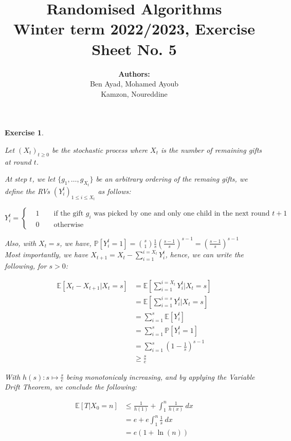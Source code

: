 \documentclass{article}
\title{Randomised Algorithms \\
Winter term 2022/2023, Exercise Sheet No. 5}
\author{
    \textbf{Authors:} \\
    Ben Ayad, Mohamed Ayoub \\
    Kamzon, Noureddine
}
\newtheorem{exo}{Exercise}
\def\P{\mathbb{P}}
\def\E{\mathbb{E}}
\begin{document}
\maketitle

\begin{exo}{\ \\}

Let $(X_t)_{t\geq0}$ be the stochastic process where $X_t$ is the number of remaining gifts at round $t$.

\noindent
At step $t$, we let $\{g_1, \dots, g_{X_t}\}$ be an arbitrary ordering of the remaing gifts, we define the RVs $(Y_i^{t})_{1\leq i\leq X_t}$ as follows: 

\[   
Y_i^{t} = 
\begin{cases}
    &1 \quad \quad \text{if the gift $g_i$ was picked by one and only one child in the next round $t+1$} \\
    &0 \quad \quad \text{otherwise}
\end{cases}
\]

Also, with $X_t = s$, we have, $\P[Y_i^t = 1] = \binom{s}{1} \frac{1}{s} (\frac{s-1}{s})^{s-1} = (\frac{s-1}{s})^{s-1}$   \\

Most importantly, we have $X_{t+1} = X_t - \sum_{i=1}^{i=X_t} Y_i^{t} $, hence, we can write the following, for $s>0$:

\begin{align*}
    \E[X_t-X_{t+1}| X_t=s] 
    &= \E[\sum_{i=1}^{i=X_t} Y_i^t| X_t = s] \\
    &= \E[\sum_{i=1}^{i=s} Y_i^t| X_t = s] \\
    &= \sum_{i=1}^{s} \E[Y_i^t] \\
    &= \sum_{i=1}^{s} \P[Y_i^t = 1] \\
    &= \sum_{i=1}^{s} (1 - \frac{1}{s})^{s-1} \\
    &\geq \frac{s}{e} 
\end{align*}

With $h(s): s \mapsto \frac{s}{e}$ being monotonicaly increasing, and by applying the Variable Drift Theorem, we conclude the following:

\begin{align*}
    \E[T|X_0=n]
    &\leq \frac{1}{h(1)} + \int_{{1}}^{{n}} {\frac{1}{h(x)} } \: d{x} \\
    &= e + e \int_{{1}}^{{n}} {\frac{1}{s} } \: d{x} \\
    &= e(1 + \ln(n)) \\ 
\end{align*}
\end{exo}
\end{document}
